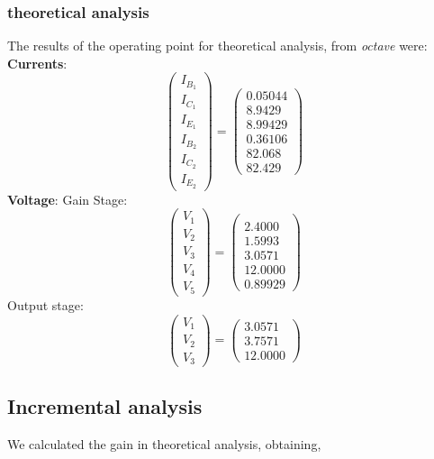 \subsubsection{theoretical analysis}
The results of the operating point for theoretical analysis, from \textit{octave}
were:
\textbf{Currents}:
\begin{equation}
\left(\begin{array}{c} I_{B_1} \\ I_{C_1} \\ I_{E_1} \\I_{B_2} \\ I_{C_2} \\ I_{E_2} \end{array}\right) 
= \left(\begin{array}{c} 0.05044 \\ 8.9429 \\ 8.99429 \\ 0.36106\\ 82.068 \\ 82.429 \end{array}\right)
\end{equation}
\textbf{Voltage}:
Gain Stage:
\begin{equation}
\left(\begin{array}{c} V_1 \\ V_2\\ V_3 \\ V_4 \\ V_5 \end{array}\right) 
= \left(\begin{array}{c} \\ 2.4000 \\ 1.5993\\ 3.0571 \\ 12.0000 \\0.89929 \end{array}\right)
\end{equation}
Output stage:
\begin{equation}
\left(\begin{array}{c} V_1 \\ V_2\\ V_3  \end{array}\right) 
= \left(\begin{array}{c} 3.0571 \\ 3.7571 \\ 12.0000
\end{array}\right)
\end{equation}
\subsection{Incremental analysis}
We calculated the gain in theoretical analysis, obtaining, 



